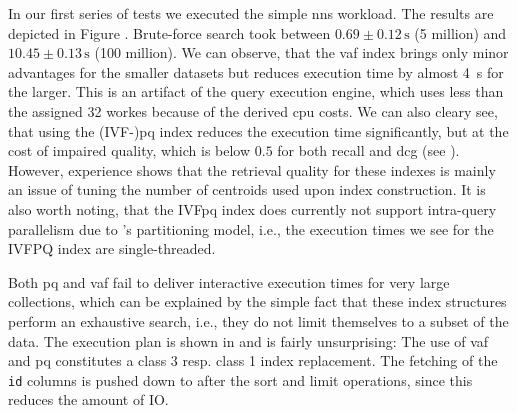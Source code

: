 In our first series of tests we executed the simple \acrshort{nns} workload. The results are depicted in Figure . Brute-force search took between $0.69 \pm 0.12 \, \si{\second}$ (5 million) and $10.45 \pm 0.13 \, \si{\second}$ (100 million). We can observe, that the \acrshort{vaf} index brings only minor advantages for the smaller datasets but reduces execution time by almost \SI{4}{\second} for the larger. This is an artifact of the query execution engine, which uses less than the assigned 32 workes because of the derived \acrshort{cpu} costs. We can also cleary see, that using the (IVF-)\acrshort{pq} index reduces the execution time significantly, but at the cost of impaired quality, which is below $0.5$ for both recall and \acrshort{dcg} (see ). However, experience shows that the retrieval quality for these indexes is mainly an issue of tuning the number of centroids used upon index construction. It is also worth noting, that the IVF\acrshort{pq} index does currently not support intra-query parallelism due to \cottontail{}'s partitioning model, i.e., the execution times we see for the IVFPQ index are single-threaded. 

Both \acrshort{pq} and \acrshort{vaf} fail to deliver interactive execution times for very large collections, which can be explained by  the simple fact that these index structures perform an exhaustive search, i.e., they do not limit themselves to a subset of the data. The execution plan is shown in  and is fairly unsurprising: The use of \acrshort{vaf} and \acrshort{pq} constitutes a class 3 resp. class 1 index replacement. The fetching of the \texttt{id} columns is pushed down to after the sort and limit operations, since this reduces the amount of IO.

